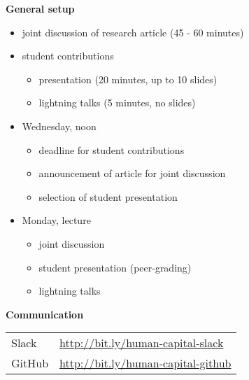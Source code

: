 \begin{frame}\textbf{General setup}\vspace{0.5cm}

\begin{itemize}\setlength\itemsep{1em}
\item joint discussion of research article (45 - 60 minutes)
\item student contributions\medskip
\begin{itemize}\setlength\itemsep{1em}
  \item presentation (20 minutes, up to 10 slides)
  \item lightning talks (5 minutes, no slides)
\end{itemize}
\end{itemize}

\end{frame}
\begin{frame}

\begin{itemize}\setlength\itemsep{1em}
  \item Wednesday, noon\medskip
  \begin{itemize}\setlength\itemsep{1em}
    \item deadline for student contributions
    \item announcement of article for joint discussion
    \item selection of student presentation
  \end{itemize}
  \item Monday, lecture\medskip
  \begin{itemize}\setlength\itemsep{1em}
    \item joint discussion
    \item student presentation (peer-grading)
    \item lightning talks
  \end{itemize}
\end{itemize}
\end{frame}
\begin{frame}
\textbf{Communication}\\\vspace{0.5cm}
\begin{tabular}{ll}
Slack     & \url{http://bit.ly/human-capital-slack} \\
GitHub    & \url{http://bit.ly/human-capital-github} \\
\end{tabular}
\end{frame}
